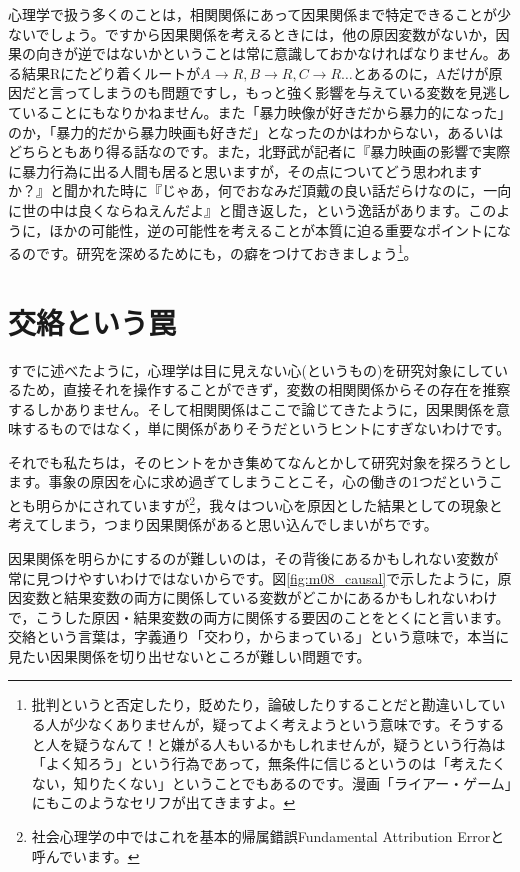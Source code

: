\documentclass{ltjbook}
\begin{document}
心理学で扱う多くのことは，相関関係にあって因果関係まで特定できることが少ないでしょう。ですから因果関係を考えるときには，他の原因変数がないか，因果の向きが逆ではないかということは常に意識しておかなければなりません。ある結果Rにたどり着くルートが$A \to R, B\to R, C\to R \ldots$とあるのに，Aだけが原因だと言ってしまうのも問題ですし，もっと強く影響を与えている変数を見逃していることにもなりかねません。また「暴力映像が好きだから暴力的になった」のか，「暴力的だから暴力映画も好きだ」となったのかはわからない，あるいはどちらともあり得る話なのです。また，北野武が記者に『暴力映画の影響で実際に暴力行為に出る人間も居ると思いますが，その点についてどう思われますか？』と聞かれた時に『じゃあ，何でおなみだ頂戴の良い話だらけなのに，一向に世の中は良くならねえんだよ』と聞き返した，という逸話があります。このように，ほかの可能性，逆の可能性を考えることが本質に迫る重要なポイントになるのです。研究を深めるためにも，の癖をつけておきましょう\footnote{批判というと否定したり，貶めたり，論破したりすることだと勘違いしている人が少なくありませんが，疑ってよく考えようという意味です。そうすると人を疑うなんて！と嫌がる人もいるかもしれませんが，疑うという行為は「よく知ろう」という行為であって，無条件に信じるというのは「考えたくない，知りたくない」ということでもあるのです。漫画「ライアー・ゲーム」にもこのようなセリフが出てきますよ。}。

\section{交絡という罠}
\label{confounding}
すでに述べたように，心理学は目に見えない心(というもの)を研究対象にしているため，直接それを操作することができず，変数の相関関係からその存在を推察するしかありません。そして相関関係はここで論じてきたように，因果関係を意味するものではなく，単に関係がありそうだというヒントにすぎないわけです。

それでも私たちは，そのヒントをかき集めてなんとかして研究対象を探ろうとします。事象の原因を心に求め過ぎてしまうことこそ，心の働きの1つだということも明らかにされていますが\footnote{社会心理学の中ではこれを基本的帰属錯誤Fundamental Attribution Errorと呼んでいます。}，我々はつい心を原因とした結果としての現象と考えてしまう，つまり因果関係があると思い込んでしまいがちです。

因果関係を明らかにするのが難しいのは，その背後にあるかもしれない変数が常に見つけやすいわけではないからです。図\ref{fig:m08_causal}で示したように，原因変数と結果変数の両方に関係している変数がどこかにあるかもしれないわけで，こうした原因・結果変数の両方に関係する要因のことをとくにと言います。交絡という言葉は，字義通り「交わり，からまっている」という意味で，本当に見たい因果関係を切り出せないところが難しい問題です。
\end{document}
